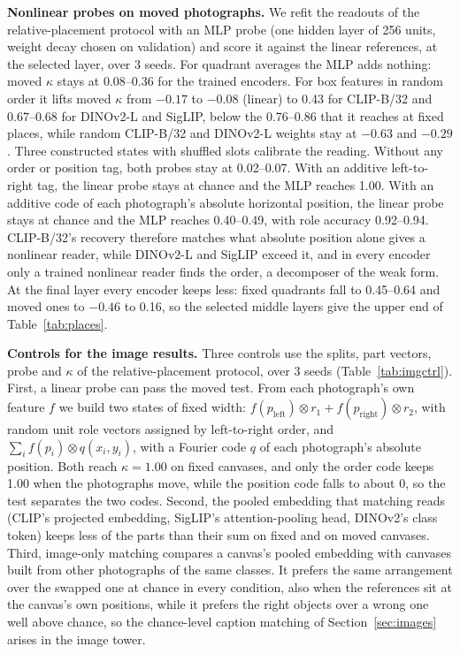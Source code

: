 \textbf{Nonlinear probes on moved photographs.} We refit the readouts of the relative-placement protocol with an MLP probe (one hidden layer of 256 units, weight decay chosen on validation) and score it against the linear references, at the selected layer, over 3 seeds. For quadrant averages the MLP adds nothing: moved $\kappa$ stays at 0.08--0.36 for the trained encoders. For box features in random order it lifts moved $\kappa$ from $-0.17$ to $-0.08$ (linear) to 0.43 for CLIP-B/32 and 0.67--0.68 for DINOv2-L and SigLIP, below the 0.76--0.86 that it reaches at fixed places, while random CLIP-B/32 and DINOv2-L weights stay at $-0.63$ and $-0.29$. Three constructed states with shuffled slots calibrate the reading. Without any order or position tag, both probes stay at 0.02--0.07. With an additive left-to-right tag, the linear probe stays at chance and the MLP reaches 1.00. With an additive code of each photograph's absolute horizontal position, the linear probe stays at chance and the MLP reaches 0.40--0.49, with role accuracy 0.92--0.94. CLIP-B/32's recovery therefore matches what absolute position alone gives a nonlinear reader, while DINOv2-L and SigLIP exceed it, and in every encoder only a trained nonlinear reader finds the order, a decomposer of the weak form. At the final layer every encoder keeps less: fixed quadrants fall to 0.45--0.64 and moved ones to $-0.46$ to 0.16, so the selected middle layers give the upper end of Table~\ref{tab:places}.

\textbf{Controls for the image results.} Three controls use the splits, part vectors, probe and $\kappa$ of the relative-placement protocol, over 3 seeds (Table~\ref{tab:imgctrl}). First, a linear probe can pass the moved test. From each photograph's own feature $f$ we build two states of fixed width: $f(p_\mathrm{left}) \otimes r_1 + f(p_\mathrm{right}) \otimes r_2$, with random unit role vectors assigned by left-to-right order, and $\sum_i f(p_i) \otimes q(x_i, y_i)$, with a Fourier code $q$ of each photograph's absolute position. Both reach $\kappa = 1.00$ on fixed canvases, and only the order code keeps 1.00 when the photographs move, while the position code falls to about 0, so the test separates the two codes. Second, the pooled embedding that matching reads (CLIP's projected embedding, SigLIP's attention-pooling head, DINOv2's class token) keeps less of the parts than their sum on fixed and on moved canvases. Third, image-only matching compares a canvas's pooled embedding with canvases built from other photographs of the same classes. It prefers the same arrangement over the swapped one at chance in every condition, also when the references sit at the canvas's own positions, while it prefers the right objects over a wrong one well above chance, so the chance-level caption matching of Section~\ref{sec:images} arises in the image tower.

